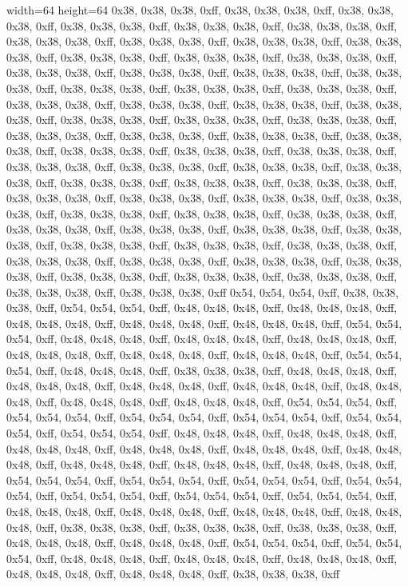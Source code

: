 width=64
height=64
0x38, 0x38, 0x38, 0xff, 0x38, 0x38, 0x38, 0xff, 0x38, 0x38, 0x38, 0xff, 0x38, 0x38, 0x38, 0xff, 0x38, 0x38, 0x38, 0xff, 0x38, 0x38, 0x38, 0xff, 0x38, 0x38, 0x38, 0xff, 0x38, 0x38, 0x38, 0xff, 0x38, 0x38, 0x38, 0xff, 0x38, 0x38, 0x38, 0xff, 0x38, 0x38, 0x38, 0xff, 0x38, 0x38, 0x38, 0xff, 0x38, 0x38, 0x38, 0xff, 0x38, 0x38, 0x38, 0xff, 0x38, 0x38, 0x38, 0xff, 0x38, 0x38, 0x38, 0xff, 0x38, 0x38, 0x38, 0xff, 0x38, 0x38, 0x38, 0xff, 0x38, 0x38, 0x38, 0xff, 0x38, 0x38, 0x38, 0xff, 0x38, 0x38, 0x38, 0xff, 0x38, 0x38, 0x38, 0xff, 0x38, 0x38, 0x38, 0xff, 0x38, 0x38, 0x38, 0xff, 0x38, 0x38, 0x38, 0xff, 0x38, 0x38, 0x38, 0xff, 0x38, 0x38, 0x38, 0xff, 0x38, 0x38, 0x38, 0xff, 0x38, 0x38, 0x38, 0xff, 0x38, 0x38, 0x38, 0xff, 0x38, 0x38, 0x38, 0xff, 0x38, 0x38, 0x38, 0xff, 0x38, 0x38, 0x38, 0xff, 0x38, 0x38, 0x38, 0xff, 0x38, 0x38, 0x38, 0xff, 0x38, 0x38, 0x38, 0xff, 0x38, 0x38, 0x38, 0xff, 0x38, 0x38, 0x38, 0xff, 0x38, 0x38, 0x38, 0xff, 0x38, 0x38, 0x38, 0xff, 0x38, 0x38, 0x38, 0xff, 0x38, 0x38, 0x38, 0xff, 0x38, 0x38, 0x38, 0xff, 0x38, 0x38, 0x38, 0xff, 0x38, 0x38, 0x38, 0xff, 0x38, 0x38, 0x38, 0xff, 0x38, 0x38, 0x38, 0xff, 0x38, 0x38, 0x38, 0xff, 0x38, 0x38, 0x38, 0xff, 0x38, 0x38, 0x38, 0xff, 0x38, 0x38, 0x38, 0xff, 0x38, 0x38, 0x38, 0xff, 0x38, 0x38, 0x38, 0xff, 0x38, 0x38, 0x38, 0xff, 0x38, 0x38, 0x38, 0xff, 0x38, 0x38, 0x38, 0xff, 0x38, 0x38, 0x38, 0xff, 0x38, 0x38, 0x38, 0xff, 0x38, 0x38, 0x38, 0xff, 0x38, 0x38, 0x38, 0xff, 0x38, 0x38, 0x38, 0xff, 0x38, 0x38, 0x38, 0xff, 0x38, 0x38, 0x38, 0xff, 0x38, 0x38, 0x38, 0xff
0x54, 0x54, 0x54, 0xff, 0x38, 0x38, 0x38, 0xff, 0x54, 0x54, 0x54, 0xff, 0x48, 0x48, 0x48, 0xff, 0x48, 0x48, 0x48, 0xff, 0x48, 0x48, 0x48, 0xff, 0x48, 0x48, 0x48, 0xff, 0x48, 0x48, 0x48, 0xff, 0x54, 0x54, 0x54, 0xff, 0x48, 0x48, 0x48, 0xff, 0x48, 0x48, 0x48, 0xff, 0x48, 0x48, 0x48, 0xff, 0x48, 0x48, 0x48, 0xff, 0x48, 0x48, 0x48, 0xff, 0x48, 0x48, 0x48, 0xff, 0x54, 0x54, 0x54, 0xff, 0x48, 0x48, 0x48, 0xff, 0x38, 0x38, 0x38, 0xff, 0x48, 0x48, 0x48, 0xff, 0x48, 0x48, 0x48, 0xff, 0x48, 0x48, 0x48, 0xff, 0x48, 0x48, 0x48, 0xff, 0x48, 0x48, 0x48, 0xff, 0x48, 0x48, 0x48, 0xff, 0x48, 0x48, 0x48, 0xff, 0x54, 0x54, 0x54, 0xff, 0x54, 0x54, 0x54, 0xff, 0x54, 0x54, 0x54, 0xff, 0x54, 0x54, 0x54, 0xff, 0x54, 0x54, 0x54, 0xff, 0x54, 0x54, 0x54, 0xff, 0x48, 0x48, 0x48, 0xff, 0x48, 0x48, 0x48, 0xff, 0x48, 0x48, 0x48, 0xff, 0x48, 0x48, 0x48, 0xff, 0x48, 0x48, 0x48, 0xff, 0x48, 0x48, 0x48, 0xff, 0x48, 0x48, 0x48, 0xff, 0x48, 0x48, 0x48, 0xff, 0x48, 0x48, 0x48, 0xff, 0x54, 0x54, 0x54, 0xff, 0x54, 0x54, 0x54, 0xff, 0x54, 0x54, 0x54, 0xff, 0x54, 0x54, 0x54, 0xff, 0x54, 0x54, 0x54, 0xff, 0x54, 0x54, 0x54, 0xff, 0x54, 0x54, 0x54, 0xff, 0x48, 0x48, 0x48, 0xff, 0x48, 0x48, 0x48, 0xff, 0x48, 0x48, 0x48, 0xff, 0x48, 0x48, 0x48, 0xff, 0x38, 0x38, 0x38, 0xff, 0x38, 0x38, 0x38, 0xff, 0x38, 0x38, 0x38, 0xff, 0x48, 0x48, 0x48, 0xff, 0x48, 0x48, 0x48, 0xff, 0x54, 0x54, 0x54, 0xff, 0x54, 0x54, 0x54, 0xff, 0x48, 0x48, 0x48, 0xff, 0x48, 0x48, 0x48, 0xff, 0x48, 0x48, 0x48, 0xff, 0x48, 0x48, 0x48, 0xff, 0x48, 0x48, 0x48, 0xff, 0x38, 0x38, 0x38, 0xff

